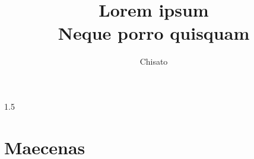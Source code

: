 \documentclass[oneside]{book} %
\newcommand{\bookTitle}{Lorem ipsum} %
\newcommand{\bookSubtitle}{Neque porro quisquam} %
\newcommand{\bookAuthor}{Chisato} %
\begin{document}
    \begin{spacing}{1.5} %
        
        
        \frontmatter
        
        \title{\Huge{\textbf{\bookTitle}} \\ \LARGE{\bookSubtitle}} %
        \author{\bookAuthor} %
        \date{} %

        \maketitle %

        
        \setcounter{tocdepth}{1} %
        \tableofcontents %


        \mainmatter
        
        \part{Maecenas}
            

        \appendix
            
        
        
        \backmatter
        
    \end{spacing}
\end{document}
